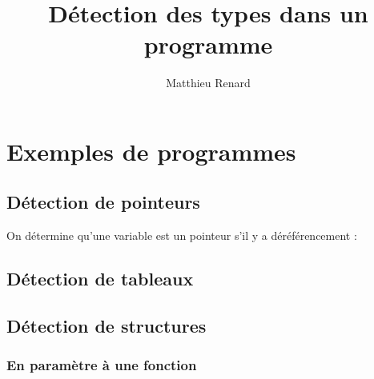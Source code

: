 \documentclass[a4paper,11pt]{article}
\title{Détection des types dans un programme}
\author{Matthieu Renard}
\begin{document}
\maketitle{}

\newpage

\section{Exemples de programmes}
\subsection{Détection de pointeurs}

On détermine qu'une variable est un pointeur s'il y a déréférencement :

\begin{multicols}{2}


\columnbreak


\end{multicols}

\newpage

\subsection{Détection de tableaux}

\begin{multicols}{2}


\columnbreak


\end{multicols}


\newpage

\subsection{Détection de structures}
\subsubsection{En paramètre à une fonction}
\begin{multicols}{2}


\columnbreak


\end{multicols}
\end{document}
